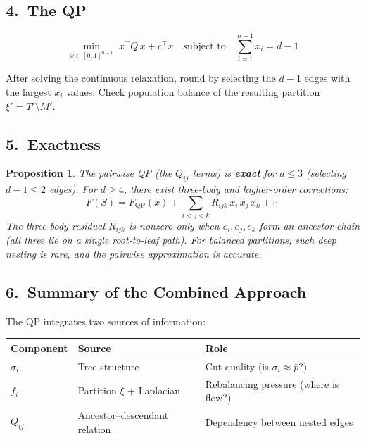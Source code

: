 \documentclass[11pt]{article}
\newcommand{\pbar}{\bar{p}}
\newtheorem{proposition}{Proposition}
\begin{document}
\subsection*{4.\ The QP}

\[
\boxed{
  \min_{x \in [0,1]^{n-1}} \; x^\top Q\, x + c^\top x
  \quad \text{subject to} \quad
  \sum_{i=1}^{n-1} x_i = d - 1
}
\]

After solving the continuous relaxation, round by selecting the $d - 1$ edges
with the largest $x_i$ values. Check population balance of the resulting
partition $\xi' = T' \setminus M'$.

\subsection*{5.\ Exactness}

\begin{proposition}
The pairwise QP (the $Q_{ij}$ terms) is \textbf{exact} for $d \leq 3$
(selecting $d - 1 \leq 2$ edges). For $d \geq 4$, there exist three-body
and higher-order corrections:
\[
  F(S) = F_{\mathrm{QP}}(x) + \sum_{i < j < k} R_{ijk}\, x_i\, x_j\, x_k
  + \cdots
\]
The three-body residual $R_{ijk}$ is nonzero only when $e_i, e_j, e_k$ form
an ancestor chain (all three lie on a single root-to-leaf path). For balanced
partitions, such deep nesting is rare, and the pairwise approximation is
accurate.
\end{proposition}


\subsection*{6.\ Summary of the Combined Approach}

The QP integrates two sources of information:

\medskip
\begin{center}
\begin{tabular}{lll}
\toprule
\textbf{Component} & \textbf{Source} & \textbf{Role} \\
\midrule
$\sigma_i$ & Tree structure & Cut quality (is $\sigma_i \approx \pbar$?) \\
$f_i$ & Partition $\xi$ + Laplacian & Rebalancing pressure (where is flow?) \\
$Q_{ij}$ & Ancestor--descendant relation & Dependency between nested edges \\
\bottomrule
\end{tabular}
\end{center}
\end{document}

